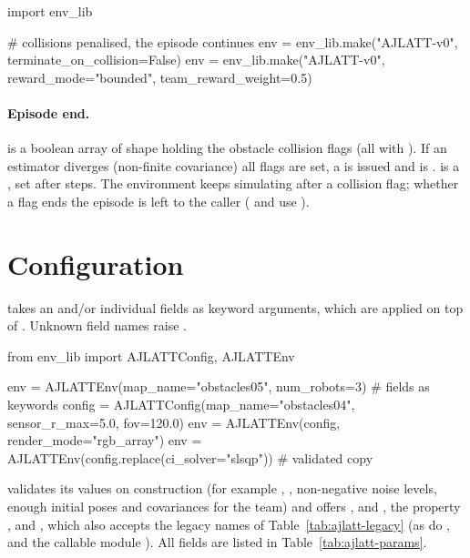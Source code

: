 \begin{pycode}
import env_lib

# collisions penalised, the episode continues
env = env_lib.make("AJLATT-v0", terminate_on_collision=False)
env = env_lib.make("AJLATT-v0", reward_mode="bounded", team_reward_weight=0.5)
\end{pycode}

\paragraph{Episode end.}  is a boolean array of shape
 holding the obstacle collision flags (all 
with ). If an estimator diverges
(non-finite covariance) all flags are set, a  is issued and
 is .  is a
, set after  steps. The environment keeps
simulating after a collision flag; whether a flag ends the episode is left to
the caller ( and  use
).

\section{Configuration}\label{sec:ajlatt-config}

 takes an
 and/or individual fields as keyword arguments, which are
applied on top of . Unknown field names raise .

\begin{pycode}
from env_lib import AJLATTConfig, AJLATTEnv

env = AJLATTEnv(map_name="obstacles05", num_robots=3)   # fields as keywords
config = AJLATTConfig(map_name="obstacles04", sensor_r_max=5.0, fov=120.0)
env = AJLATTEnv(config, render_mode="rgb_array")
env = AJLATTEnv(config.replace(ci_solver="slsqp"))              # validated copy
\end{pycode}

 validates its values on construction (for example
, , non-negative
noise levels, enough initial poses and covariances for the team) and offers
,  and , the
property , and ,
which also accepts the legacy names of Table~\ref{tab:ajlatt-legacy} (as do
,  and the callable module
). All
fields are listed in Table~\ref{tab:ajlatt-params}.

